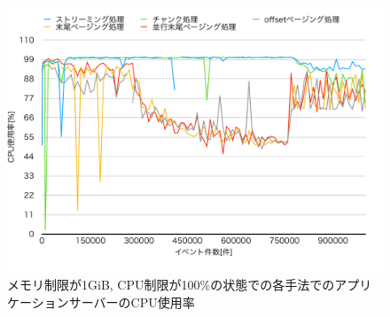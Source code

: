 \documentclass[../../../main]{subfiles}
\begin{document}
    \begin{figure}[H]
        \centering
        \includegraphics[width=12cm]{graph}
        \caption{メモリ制限が1GiB, CPU制限が100\%の状態での各手法でのアプリケーションサーバーのCPU使用率}
        \label{fig:app-cpu}
    \end{figure}
\end{document}
